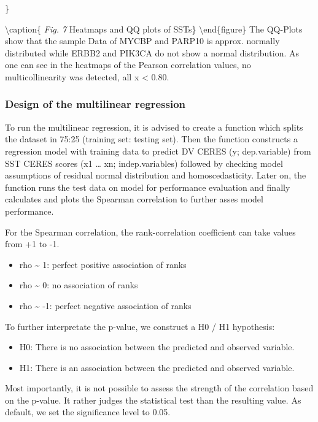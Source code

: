 \documentclass[]{article}
\providecommand{\tightlist}{%
  \setlength{\itemsep}{0pt}\setlength{\parskip}{0pt}}
\begin{document}
\}

\textbackslash caption\{ \emph{Fig. 7} Heatmaps and QQ plots of
SSTs\}\label{fig:Hm and QQ} \textbackslash end\{figure\} The QQ-Plots
show that the sample Data of MYCBP and PARP10 is approx. normally
distributed while ERBB2 and PIK3CA do not show a normal distribution. As
one can see in the heatmaps of the Pearson correlation values, no
multicollinearity was detected, all x \textless{} 0.80.

\hypertarget{design-of-the-multilinear-regression}{%
\subsubsection{Design of the multilinear
regression}\label{design-of-the-multilinear-regression}}

To run the multilinear regression, it is advised to create a function
which splits the dataset in 75:25 (training set: testing set). Then the
function constructs a regression model with training data to predict DV
CERES (y; dep.variable) from SST CERES scores (x1 \ldots{} xn;
indep.variables) followed by checking model assumptions of residual
normal distribution and homoscedasticity. Later on, the function runs
the test data on model for performance evaluation and finally calculates
and plots the Spearman correlation to further asses model performance.

For the Spearman correlation, the rank-correlation coefficient can take
values from +1 to -1.

\begin{itemize}
\tightlist
\item
  rho \textasciitilde{} 1: perfect positive association of ranks
\item
  rho \textasciitilde{} 0: no association of ranks
\item
  rho \textasciitilde{} -1: perfect negative association of ranks
\end{itemize}

To further interpretate the p-value, we construct a H0 / H1 hypothesis:

\begin{itemize}
\tightlist
\item
  H0: There is no association between the predicted and observed
  variable.
\item
  H1: There is an association between the predicted and observed
  variable.
\end{itemize}

Most importantly, it is not possible to assess the strength of the
correlation based on the p-value. It rather judges the statistical test
than the resulting value. As default, we set the significance level to
0.05.
\end{document}
